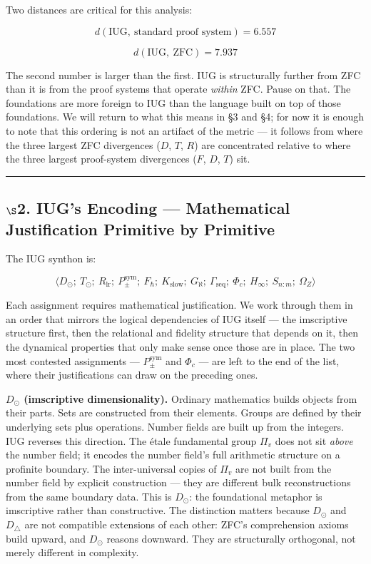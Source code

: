 \documentclass[10pt,a4paper]{article}
\begin{document}
Two distances are critical for this analysis:

\[d(\text{IUG},\ \text{standard proof system}) = 6.557\]

\[d(\text{IUG},\ \text{ZFC}) = 7.937\]

The second number is larger than the first. IUG is structurally further from ZFC
than it is from the proof systems that operate \emph{within} ZFC.
Pause on that. The foundations are more foreign to IUG than the language built on top of those
foundations. We will return to what this means in \S3 and \S4;
for now it is enough to note that this ordering is not an artifact of the metric ---
it follows from where the three largest ZFC divergences ($D$, $T$, $R$) are concentrated
relative to where the three largest proof-system divergences ($F$, $D$, $T$) sit.

\begin{center}
\rule{0.5\textwidth}{0.4pt}
\end{center}

\subsection{$\S$2. IUG's Encoding --- Mathematical Justification Primitive by Primitive}

The IUG synthon is:

{\small\[\langle D_\odot;\ T_\odot;\ R_\text{lr};\ P_{\pm}^{\text{sym}};\ F_{\hbar};\ K_\text{slow};\ G_{\aleph};\ \Gamma_\text{seq};\ \Phi_c;\ H_{\infty};\ S_{n:m};\ \Omega_Z \rangle\]}

Each assignment requires mathematical justification.
We work through them in an order that mirrors the logical dependencies of IUG itself ---
the imscriptive structure first, then the relational and fidelity structure that depends on it,
then the dynamical properties that only make sense once those are in place.
The two most contested assignments --- $P_{\pm}^{\text{sym}}$ and $\Phi_c$ ---
are left to the end of the list, where their justifications can draw on the preceding ones.

\textbf{$D_\odot$ (imscriptive dimensionality).}
Ordinary mathematics builds objects from their parts.
Sets are constructed from their elements.
Groups are defined by their underlying sets plus operations.
Number fields are built up from the integers.
IUG reverses this direction.
The étale fundamental group $\Pi_v$ does not sit \emph{above} the number field;
it encodes the number field's full arithmetic structure on a profinite boundary.
The inter-universal copies of $\Pi_v$ are not built from the number field by explicit construction
--- they are different bulk reconstructions from the same boundary data.
This is $D_\odot$: the foundational metaphor is imscriptive rather than constructive.
The distinction matters because $D_\odot$ and $D_\triangle$ are not compatible extensions of each
other: ZFC's comprehension axioms build upward, and $D_\odot$ reasons downward.
They are structurally orthogonal, not merely different in complexity.
\end{document}
